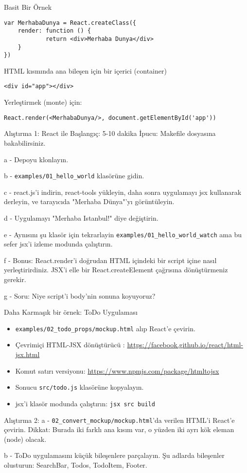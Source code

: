 \documentclass[presentation]{beamer}
\begin{document}
\begin{frame}[fragile,label=sec-16]{Basit Bir Örnek}
 \begin{verbatim}
var MerhabaDunya = React.createClass({
    render: function () {
            return <div>Merhaba Dunya</div>
    }
})
\end{verbatim}

HTML kısmında ana bileşen için bir içerici (container)
\begin{verbatim}
<div id="app"></div>
\end{verbatim}
Yerleştirmek (monte) için:
\begin{verbatim}
React.render(<MerhabaDunya/>, document.getElementById('app'))
\end{verbatim}
\end{frame}

\begin{frame}[fragile,label=sec-17]{Alıştırma 1: React ile Başlangıç: 5-10 dakika}
 İpucu: Makefile dosyasına bakabilirsiniz.

a - Depoyu klonlayın.

b - \texttt{examples/01\_hello\_world} klasörüne gidin.

c - react.js'i indirin, react-tools yükleyin, daha sonra uygulamayı jsx
kullanarak derleyin, ve tarayıcıda "Merhaba Dünya"'yı görüntüleyin.

d - Uygulamayı "Merhaba Istanbul!" diye değiştirin.

e - Aynısını şu klasör için tekrarlayin \texttt{examples/01\_hello\_world\_watch} ama bu
sefer jsx'i izleme modunda çalıştırın.

f - Bonus: React.render'i doğrudan HTML içindeki bir script içine nasıl
yerleştirirdiniz. JSX'i elle bir React.createElement çağrısına dönüştürmeniz gerekir.

g - Soru: Niye script'i body'nin sonuna koyuyoruz?
\end{frame}

\begin{frame}[fragile,label=sec-18]{Daha Karmaşık bir örnek: ToDo Uygulaması}
 \begin{itemize}
\item \texttt{examples/02\_todo\_props/mockup.html} alıp React'e çevirin.
\item Çevrimiçi HTML-JSX dönüştürücü :
\url{https://facebook.github.io/react/html-jsx.html}
\item Komut satırı versiyonu: \url{https://www.npmjs.com/package/htmltojsx}
\item Sonucu \texttt{src/todo.js} klasörüne kopyalayın.
\item jsx'i klasör modunda çalıştırın: \texttt{jsx src build}
\end{itemize}
\end{frame}

\begin{frame}[fragile,label=sec-19]{Alıştırma 2:}
 a - \texttt{02\_convert\_mockup/mockup.html}'da verilen HTML'i React'e çevirin. Dikkat:
Burada iki farklı ana kısım var, o yüzden iki ayrı kök eleman (node) olacak.

b - ToDo uygulamasını küçük bileşenlere parçalayın. Şu adlarda bileşenler
olusturun: SearchBar, Todos, TodoItem, Footer.
\end{frame}
\end{document}

